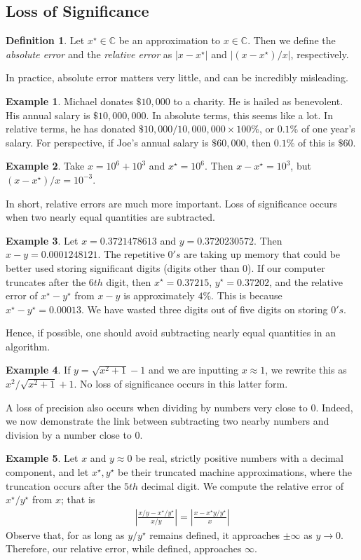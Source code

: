 \documentclass[12pt]{article}
\newcommand{\cc}{\mathbb{C}}
\newcommand{\dollar}{\$}
\theoremstyle{plain}
\theoremstyle{definition}
\newtheorem*{definition}{Definition}
\newtheorem*{example}{Example}
\theoremstyle{remark}
\numberwithin{equation}{section}  %
\begin{document}
\subsection{Loss of Significance}
\begin{definition}
Let $x^\star \in \cc$ be an approximation to $x \in \cc$. Then we define
the \emph{absolute error} and the \emph{relative error} as $|x - x^\star|$
and $|(x - x^\star)/x|$, respectively.
\end{definition}
In practice, absolute error matters very little, and can be incredibly
misleading.
\begin{example}
Michael donates $\dollar 10,000$ to a charity. He is hailed as benevolent. 
His annual salary is $ \dollar 10,000,000$. In absolute terms, this seems like a lot.
In relative terms, he has donated $\dollar 10,000/10,000,000 \times 100 \%$, or $0.1 \%$ of one year's salary. For
perspective, if Joe's annual salary is $\dollar 60,000$, then $0.1 \%$
of this is $\dollar 60$.
\end{example}
\begin{example}
Take $x = 10^6 + 10^3$ and $x^\star = 10^6$. Then $x - x^\star = 10^3$,
but $(x - x^\star)/x = 10^{-3}$.
\end{example}
In short, relative errors are much more important. 
Loss of significance occurs when two nearly equal quantities are subtracted.
\begin{example}
Let $x = 0.3721478613$ and $y = 0.3720230572$. Then $x-y = 0.0001248121$.
The repetitive $0's$ are taking up memory that could be better used storing
significant digits (digits other than $0$). If our computer truncates
after the $6th$ digit, then
$x^\star = 0.37215$, $y^\star = 0.37202$, and the relative error
of $x^\star-y^\star$ from $x-y$ is approximately $4\%$. This is because
$x^\star - y^\star = 0.00013$. We have wasted three digits out of
five digits on storing $0's$.
\end{example}
Hence, if possible, one should avoid subtracting nearly equal quantities
in an algorithm.
\begin{example}
If $y = \sqrt{x^2 + 1} -1$ and we are inputting $x \approx 1$, we rewrite this as $x^2/\sqrt{x^2 + 1} + 1$.
No loss of significance occurs in this latter form.
\end{example}
A loss of precision also occurs when dividing by numbers very close to $0$.
Indeed, we now demonstrate the link between subtracting two nearby numbers
and division by a number close to $0$.
\begin{example}
 Let $x$ and $y \approx 0$ be real, strictly positive
numbers with a decimal component, and let $x^\star, y^\star$ be their truncated
machine approximations, where the truncation occurs after the $5th$ decimal digit.
We compute the relative error of $x^\star/y^\star$ from $x$; that is
\begin{align*}
\left |\frac{x/y - x^\star/y^\star}{x/y} \right |   = \left | \frac{x - x^\star
y/y^\star}{x} \right |
\end{align*}
Observe that, for as long as $y/y^\star$ remains defined, it approaches
$\pm \infty$ as $y \to 0$. 
Therefore, our relative error, while defined, approaches $\infty$.
\end{example}
\end{document}
